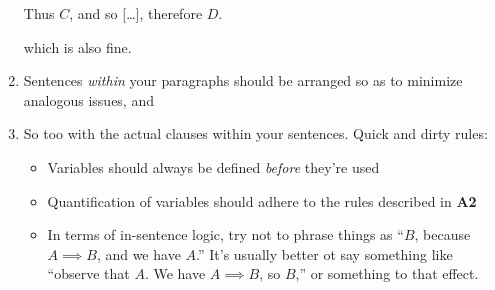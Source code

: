 \documentclass{fkpset}
\begin{document}
\begin{enumerate}[label=(\arabic*)]
\begin{leftbar}
      Thus $C$, and so [\ldots], therefore $D$.
    \end{leftbar}
    which is also fine.
  \item Sentences \emph{within} your paragraphs should be arranged so as to
    minimize analogous issues, and
  \item So too with the actual clauses within your sentences. Quick and dirty
    rules:
    \begin{itemize}
      \item Variables should always be defined \emph{before} they're used
      \item Quantification of variables should adhere to the rules described in
        \textbf{A2}
      \item In terms of in-sentence logic, try not to phrase things as ``$B$,
        because $A \implies B$, and we have $A$.'' It's usually better ot say
        something like ``observe that $A$. We have $A \implies B$, so $B$,'' or
        something to that effect.
    \end{itemize}
\end{enumerate}
\end{document}
